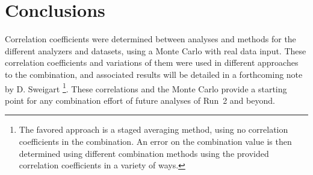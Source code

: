 
\graphicspath{{Body/Figures/}}

\clearpage
\section{Conclusions}


Correlation coefficients were determined between analyses and methods for the different \Rone \wa analyzers and datasets, using a Monte Carlo with real data input. These correlation coefficients and variations of them were used in different approaches to the \wa combination, and associated results will be detailed in a forthcoming note by D. Sweigart \cite{CombinationMeeting}\footnote{The favored approach is a staged averaging method, using no correlation coefficients in the combination. An error on the combination value is then determined using different combination methods using the provided correlation coefficients in a variety of ways.}. These correlations and the Monte Carlo provide a starting point for any combination effort of future analyses of Run~2 and beyond. 

